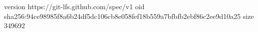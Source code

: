 version https://git-lfs.github.com/spec/v1
oid sha256:94ce98985f8a6b24df5dc106cb8e058fef18b559a7bfbfb2ebf86c2ee9d10a25
size 349692
